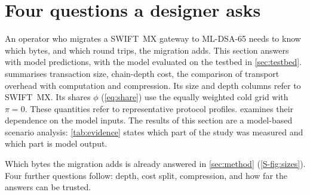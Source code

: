 \documentclass[preprint,12pt]{elsarticle}
\begin{document}
\section{Four questions a designer asks}
\label{sec:results}
An operator who migrates a SWIFT~MX gateway to ML-DSA-65 needs to know which bytes, and which round trips, the migration adds. This section answers with model predictions, with the model evaluated on the testbed in \cref{sec:testbed}.  summarises transaction size, chain-depth cost, the comparison of transport overhead with computation and compression. Its size and depth columns refer to SWIFT~MX. Its shares $\phi$ (\cref{eq:share}) use the equally weighted cold grid with $\pi=0$. These quantities refer to representative protocol profiles.  examines their dependence on the model inputs. The results of this section are a model-based scenario analysis: \cref{tab:evidence} states which part of the study was measured and which part is model output.



\begin{table}[t]
\centering\small
\caption{Model predictions for the six suites measured in TLS and for Falcon-512; the other suites of the thirteen, with the SLH-DSA rows that depend on the write pattern of large messages, are in \cref{S-tab:master_full}.}
\label{tab:master}
\end{table}

Which bytes the migration adds is already answered in \cref{sec:method} (\cref{S-fig:sizes}). Four further questions follow: depth, cost split, compression, and how far the answers can be trusted.
\end{document}
